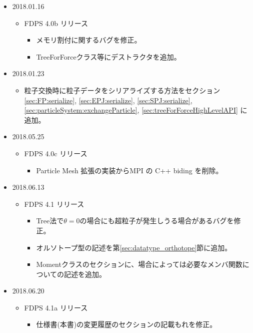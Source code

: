 \begin{itemize}
  \item 2018.01.16
    \begin{itemize}
    \item FDPS 4.0b リリース
      \begin{itemize}
      \item メモリ割付に関するバグを修正。
      \item TreeForForceクラス等にデストラクタを追加。
      \end{itemize}
    \end{itemize}
    
  \item 2018.01.23
    \begin{itemize}
    \item 粒子交換時に粒子データをシリアライズする方法をセクション
          \ref{sec:FP:serialize}, \ref{sec:EPJ:serialize}, \ref{sec:SPJ:serialize},
          \ref{sec:particleSystem:exchangeParticle}, \ref{sec:treeForForceHighLevelAPI}
          に追加。
    \end{itemize}

  \item 2018.05.25
    \begin{itemize}
    \item FDPS 4.0c リリース
      \begin{itemize}
      \item Particle Mesh 拡張の実装からMPI の C++ biding を削除。
      \end{itemize}
    \end{itemize}

  \item 2018.06.13
    \begin{itemize}
    \item FDPS 4.1 リリース
      \begin{itemize}
      \item Tree法で$\theta=0$の場合にも超粒子が発生しうる場合があるバグを修正。
      \item オルソトープ型の記述を第\ref{sec:datatype_orthotope}節に追加。
      \item Momentクラスのセクションに、場合によっては必要なメンバ関数についての記述を追加。
      \end{itemize}
    \end{itemize}

  \item 2018.06.20
    \begin{itemize}
    \item FDPS 4.1a リリース
      \begin{itemize}
      \item 仕様書(本書)の変更履歴のセクションの記載もれを修正。
      \end{itemize}
    \end{itemize}


\end{itemize}
